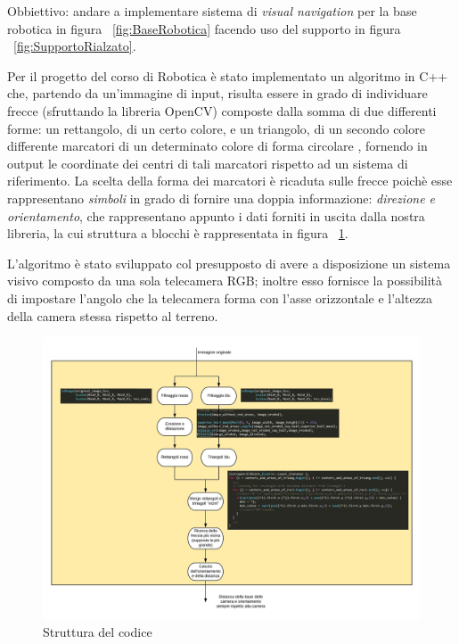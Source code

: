Obbiettivo: andare a implementare sistema di \textit{visual navigation} per la base robotica in figura ~\ref{fig:BaseRobotica} facendo uso del supporto in figura ~\ref{fig:SupportoRialzato}.

Per il progetto del corso di Robotica è stato implementato un algoritmo in
C++ che, partendo da un’immagine di input, risulta essere in grado di individuare
frecce (sfruttando la libreria OpenCV) composte dalla somma di due differenti forme: un rettangolo, di un certo colore, e un triangolo, di un secondo colore differente
marcatori di un determinato colore di forma circolare , fornendo in output le coordinate dei centri di tali marcatori rispetto ad un sistema di riferimento.
La scelta della forma dei marcatori è ricaduta sulle frecce poichè esse rappresentano \textit{simboli} in grado di fornire una doppia informazione: \textit{direzione e orientamento}, che rappresentano appunto i dati forniti in uscita dalla nostra libreria, la cui struttura a blocchi è rappresentata in figura ~\ref{fig:CodeStructure}.

L’algoritmo è stato sviluppato col presupposto di avere a disposizione un sistema visivo composto da una sola telecamera RGB; inoltre esso fornisce la possibilità di impostare l’angolo che la telecamera forma con l’asse orizzontale e l'altezza della camera stessa rispetto al terreno.


\begin{figure}
	\centering
	\includegraphics[width=\textwidth]{Immagini/CodeStructure.jpeg}
	\caption{Struttura del codice}
	\label{fig:CodeStructure}
\end{figure}

